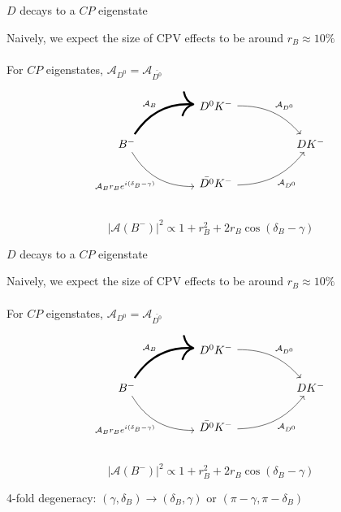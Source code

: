 \documentclass[dvipsnames]{beamer}
\begin{document}
\begin{frame}[fragile]{$D$ decays to a $C\!P$ eigenstate}
  \begin{center}
    Naively, we expect the size of CPV effects to be around $r_B\approx10\%$\\~\\
    For $C\!P$ eigenstates, $\mathcal{A}_{D^0} = \mathcal{A}_{\bar{D^0}}$
  \end{center}
  \begin{equation*}
    \begin{tikzcd}[column sep=huge]
      & D^0K^- \arrow[dr, bend left = 25, "\mathcal{A}_{D^0}"] & \\
      B^- \arrow[ur, bend left, line width = 1.7, "\mathcal{A}_B"] \arrow[dr, bend right, "\mathcal{A}_B r_B e^{i(\delta_B - \gamma)}"'] & [5cm] & DK^- \\
      & \bar{D^0}K^- \arrow[ur, bend right = 25, "\mathcal{A}_{D^0}"'] & \\
    \end{tikzcd}
  \end{equation*}
  \begin{equation*}
    \lvert\mathcal{A}(B^-)\lvert^2\propto1 + r_B^2 + 2r_B\cos(\delta_B - \gamma)
  \end{equation*}
  \begin{center}
    \phantom{4-fold degeneracy: $(\gamma, \delta_B)\to(\delta_B, \gamma)$ or $(\pi - \gamma, \pi - \delta_B)$}
  \end{center}
\end{frame}

\begin{frame}[fragile]{$D$ decays to a $C\!P$ eigenstate}
  \begin{center}
    Naively, we expect the size of CPV effects to be around $r_B\approx10\%$\\~\\
    For $C\!P$ eigenstates, $\mathcal{A}_{D^0} = \mathcal{A}_{\bar{D^0}}$
  \end{center}
  \begin{equation*}
    \begin{tikzcd}[column sep=huge]
      & D^0K^- \arrow[dr, bend left = 25, "\mathcal{A}_{D^0}"] & \\
      B^- \arrow[ur, bend left, line width = 1.7, "\mathcal{A}_B"] \arrow[dr, bend right, "\mathcal{A}_B r_B e^{i(\delta_B - \gamma)}"'] & [5cm] & DK^- \\
      & \bar{D^0}K^- \arrow[ur, bend right = 25, "\mathcal{A}_{D^0}"'] & \\
    \end{tikzcd}
  \end{equation*}
  \begin{equation*}
    \lvert\mathcal{A}(B^-)\lvert^2\propto1 + r_B^2 + 2r_B\cos(\delta_B - \gamma)
  \end{equation*}
  \begin{center}
    4-fold degeneracy: $(\gamma, \delta_B)\to(\delta_B, \gamma)$ or $(\pi - \gamma, \pi - \delta_B)$
  \end{center}
\end{frame}
\end{document}
